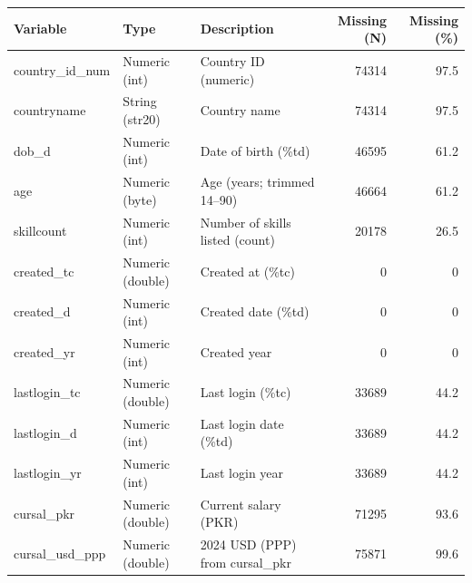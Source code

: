 \begin{threeparttable}


\begin{tabular}{@{}lllrr@{}}


\toprule


\textbf{Variable} & \textbf{Type} & \textbf{Description} & \textbf{Missing (N)} & \textbf{Missing (\%)} \\


\midrule


\midrule
country\_id\_num & Numeric (int) & Country ID (numeric)&       74314&        97.5\\
countryname & String (str20) & Country name&       74314&        97.5\\
dob\_d & Numeric (int) & Date of birth (\%td)&       46595&        61.2\\
age & Numeric (byte) & Age (years; trimmed 14–90)&       46664&        61.2\\
skillcount & Numeric (int) & Number of skills listed (count)&       20178&        26.5\\
created\_tc & Numeric (double) & Created at (\%tc)&           0&           0\\
created\_d & Numeric (int) & Created date (\%td)&           0&           0\\
created\_yr & Numeric (int) & Created year&           0&           0\\
lastlogin\_tc & Numeric (double) & Last login (\%tc)&       33689&        44.2\\
lastlogin\_d & Numeric (int) & Last login date (\%td)&       33689&        44.2\\
lastlogin\_yr & Numeric (int) & Last login year&       33689&        44.2\\
cursal\_pkr & Numeric (double) & Current salary (PKR)&       71295&        93.6\\
cursal\_usd\_ppp & Numeric (double) & 2024 USD (PPP) from cursal\_pkr&       75871&        99.6\\
\bottomrule


\end{tabular}


\end{threeparttable}
